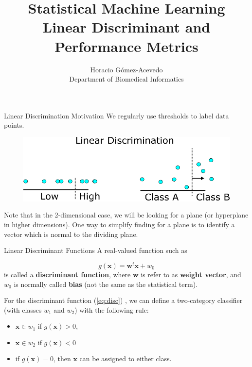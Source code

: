 \documentclass{beamer}
\title{Statistical Machine Learning\\ Linear Discriminant and Performance Metrics}
\author{Horacio G\'omez-Acevedo\\ Department of Biomedical Informatics}
\begin{document}
	\begin{frame}[plain]
		\maketitle
	\end{frame}
	
	\begin{frame}{Linear Discrimination Motivation}
		We regularly use thresholds to label data points. 
		\begin{figure}
			\centering
			\includegraphics{../../Figures/fig_linear_disc.png}
		\end{figure}	
		Note that in the 2-dimensional case, we will be looking for a plane (or hyperplane in higher dimensions). One way to simplify finding for a plane is to identify a vector which is normal to the dividing plane. 
	\end{frame}
	
	\begin{frame}{Linear Discriminant Functions}
		A real-valued  function such as 
	
		\begin{equation}
			g(\mathbf{x})=\mathbf{w}^t \mathbf{x} +w_0	
			\label{eq:disc}
	\end{equation}	
	is called a {\bf discriminant function},
	where $\mathbf{w}$ is refer to as {\bf weight vector}, and  $w_0$  is normally called {\bf bias} (not the same as the statistical term). 
	
	For the discriminant function (\ref{eq:disc}) , we can define a two-category classifier (with classes $w_1$ and $w_2$) with the following rule:
	\begin{itemize}
		\item $\mathbf{x}\in w_1$ if $g(\mathbf{x}) >0$,
		\item $\mathbf{x}\in w_2$ if $g(\mathbf{x}) <0$
		\item if $g(\mathbf{x})=0$, then $\mathbf{x}$ can be assigned to either class.
	\end{itemize}
\end{frame}
\end{document}
